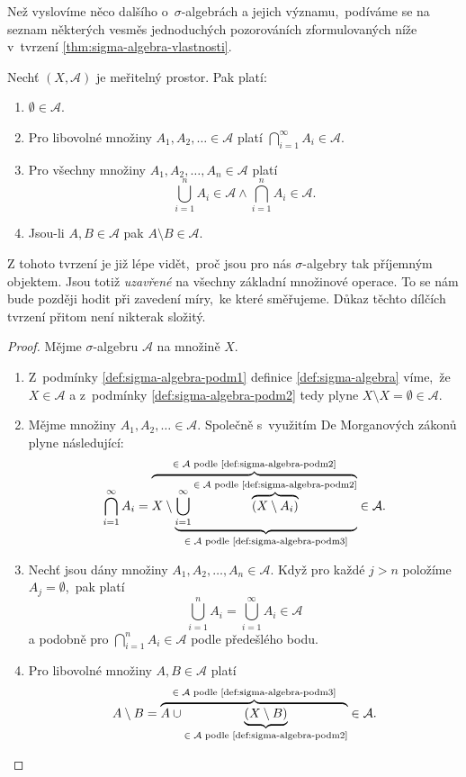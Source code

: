 Než vyslovíme něco dalšího o~$\sigma$-algebrách a jejich významu,~podíváme se na seznam některých vesměs jednoduchých pozorováních zformulovaných níže v~tvrzení \ref{thm:sigma-algebra-vlastnosti}.
\begin{theorem}\label{thm:sigma-algebra-vlastnosti}
    Nechť $(X,\mathcal{A})$ je meřitelný prostor. Pak platí:
    \begin{enumerate}[label=(\roman*)]
        \item $\emptyset\in\mathcal{A}$.
        \item Pro libovolné množiny $A_1,A_2,\ldots\in\mathcal{A}$ platí $\bigcap_{i=1}^\infty A_i\in\mathcal{A}$.
        \item Pro všechny množiny $A_1,A_2,\ldots,A_n\in\mathcal{A}$ platí
        \[\bigcup_{i=1}^n A_i\in\mathcal{A}\land\bigcap_{i=1}^n A_i\in\mathcal{A}.\]
        \item Jsou-li $A,B\in\mathcal{A}$ pak $A\setminus B\in\mathcal{A}$.
    \end{enumerate}
\end{theorem}

Z tohoto tvrzení je již lépe vidět,~proč jsou pro nás $\sigma$-algebry tak příjemným objektem. Jsou totiž \emph{uzavřené} na všechny základní množinové operace. To se nám bude později hodit při zavedení míry,~ke které směřujeme. Důkaz těchto dílčích tvrzení přitom není nikterak složitý.
\begin{proof}
    Mějme $\sigma$-algebru $\mathcal{A}$ na množině $X$.
    \begin{enumerate}[label=\textit{(\roman*)}]
        \item Z~podmínky \ref{def:sigma-algebra-podm1} definice \ref{def:sigma-algebra} víme,~že $X\in\mathcal{A}$ a z~podmínky \ref{def:sigma-algebra-podm2} tedy plyne $X\setminus X=\emptyset\in\mathcal{A}$.
        \item Mějme množiny $A_1,A_2,\ldots\in\mathcal{A}$. Společně s~využitím De Morganových zákonů plyne následující:
        \[\bigcap\limits_{i=1}^\infty A_i=\overbrace{X\setminus\underbrace{\bigcup\limits_{i=1}^\infty \overbrace{(X\setminus A_i)}^{\text{$\in\mathcal{A}$ podle \ref{def:sigma-algebra-podm2}}}}_{\text{$\in\mathcal{A}$ podle \ref{def:sigma-algebra-podm3}}}}^\text{$\in\mathcal{A}$ podle \ref{def:sigma-algebra-podm2}}\in\mathcal{A}.\]
        \item Nechť jsou dány množiny $A_1,A_2,\ldots,A_n\in\mathcal{A}$. Když pro každé $j>n$ položíme $A_j=\emptyset$,~pak platí
        \[\bigcup\limits_{i=1}^n A_i=\bigcup\limits_{i=1}^\infty A_i\in\mathcal{A}\]
        a podobně pro $\bigcap_{i=1}^n A_i\in\mathcal{A}$ podle předešlého bodu.
        \item Pro libovolné množiny $A,B\in\mathcal{A}$ platí
        \[A\setminus B=\overbrace{A\cup\underbrace{(X\setminus B)}_{\text{$\in\mathcal{A}$ podle \ref{def:sigma-algebra-podm2}}}}^{\text{$\in\mathcal{A}$ podle \ref{def:sigma-algebra-podm3}}}\in\mathcal{A}.\]
    \end{enumerate}
\end{proof}

